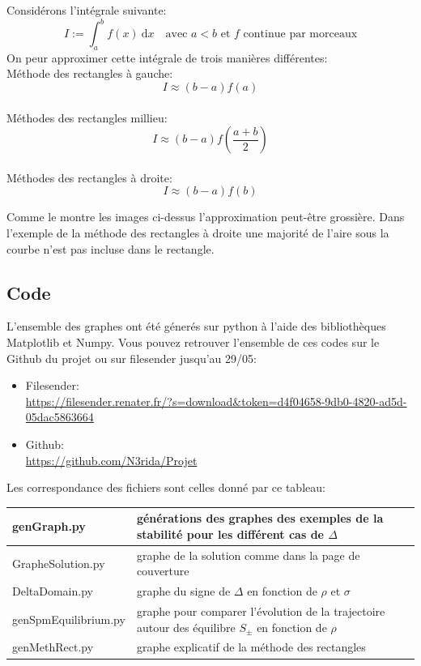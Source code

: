 \documentclass{article}
\newtheorem[M , nocut]{prop}{Proposition}[section]
\newtheorem[M , nocut]{definition}{Définition}
\newtheorem[M , nocut]{lemme}{Lemme}
\newtheorem[L , nocut]{thm}{Théoreme}
\newtheorem[M , nocut]{cor}{Corollaire}
\begin{document}
Considérons l'intégrale suivante:
\[
  I := \int_a^b f(x)\ \mathrm{d}x\quad \text{avec }a<b \text{ et } f \text{ continue par morceaux}
\] 
On peur approximer cette intégrale de trois manières différentes:\\
Méthode des rectangles à gauche:
\[
    I \approx (b-a) f(a)
\]\\
Méthodes des rectangles millieu:
\[
    I \approx (b-a) f(\frac{a+b}{2})
\]\\
Méthodes des rectangles à droite:
\[
    I \approx (b-a) f(b)
\]
\begin{example}[Remarque]
    Comme le montre les images ci-dessus l'approximation peut-être grossière. Dans l'exemple de la méthode des rectangles à droite une majorité de l'aire sous la courbe n'est pas incluse dans le rectangle.
\end{example}

\subsection*{Code}
L'ensemble des graphes ont été génerés sur python à l'aide des bibliothèques Matplotlib et Numpy. Vous pouvez retrouver l'ensemble de ces codes sur le Github du projet ou sur filesender jusqu'au 29/05:
\begin{itemize}
    \item Filesender:\\ \url{https://filesender.renater.fr/?s=download&token=d4f04658-9db0-4820-ad5d-05dac5863664}
    \item Github:\\ \url{https://github.com/N3rida/Projet}
\end{itemize}
Les correspondance des fichiers sont celles donné par ce tableau:\\
\begin{tabular}{|m{}|m{}|}
    \hline
    genGraph.py & générations des graphes des exemples de la stabilité pour les différent cas de $\Delta$\\
    \hline
    GrapheSolution.py & graphe de la solution comme dans la page de couverture\\
    \hline
    DeltaDomain.py & graphe du signe de $\Delta$ en fonction de $\rho$ et $\sigma$\\
    \hline
    genSpmEquilibrium.py & graphe pour comparer l'évolution de la trajectoire autour des équilibre $S_\pm$ en fonction de $\rho$\\
    \hline
    genMethRect.py & graphe explicatif de la méthode des rectangles\\
    \hline
\end{tabular}

\newpage
\nocite{*}
\printbibliography[heading=bibintoc,title={Bibliographie}]
\end{document}
